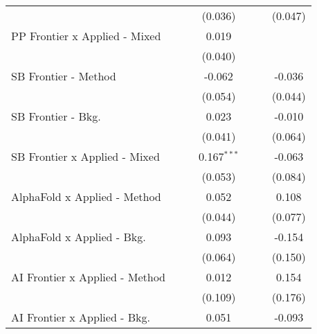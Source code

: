 \begin{tabular}{lcccccc}
                                  &              &              & (0.036)       &               &              & (0.047)\\   
   PP Frontier x Applied - Mixed  &              &              & 0.019         &               &              &   \\   
                                  &              &              & (0.040)       &               &              &   \\   
   SB Frontier - Method           &              &              & -0.062        &               &              & -0.036\\   
                                  &              &              & (0.054)       &               &              & (0.044)\\   
   SB Frontier - Bkg.             &              &              & 0.023         &               &              & -0.010\\   
                                  &              &              & (0.041)       &               &              & (0.064)\\   
   SB Frontier x Applied - Mixed  &              &              & 0.167$^{***}$ &               &              & -0.063\\   
                                  &              &              & (0.053)       &               &              & (0.084)\\   
   AlphaFold x Applied - Method   &              &              & 0.052         &               &              & 0.108\\   
                                  &              &              & (0.044)       &               &              & (0.077)\\   
   AlphaFold x Applied - Bkg.     &              &              & 0.093         &               &              & -0.154\\   
                                  &              &              & (0.064)       &               &              & (0.150)\\   
   AI Frontier x Applied - Method &              &              & 0.012         &               &              & 0.154\\   
                                  &              &              & (0.109)       &               &              & (0.176)\\   
   AI Frontier x Applied - Bkg.   &              &              & 0.051         &               &              & -0.093\\   

\end{tabular}
